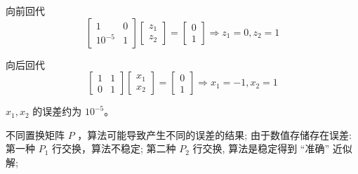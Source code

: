 \begin{example}
    向前回代
    $$
        \left[\begin{array}{cc}
                1       & 0 \\
                10^{-5} & 1
            \end{array}\right]\left[\begin{array}{l}
                z_{1} \\
                z_{2}
            \end{array}\right]=\left[\begin{array}{l}
                0 \\
                1
            \end{array}\right] \Rightarrow z_{1}=0, z_{2}=1
    $$

    向后回代
    $$
        \left[\begin{array}{ll}
                1 & 1 \\
                0 & 1
            \end{array}\right]\left[\begin{array}{l}
                x_{1} \\
                x_{2}
            \end{array}\right]=\left[\begin{array}{l}
                0 \\
                1
            \end{array}\right] \Rightarrow x_{1}=-1, x_{2}=1
    $$

    \begin{remark}
        $ x_{1}, x_{2} $ 的误差约为 $ 10^{-5} $。
    \end{remark}

\end{example}


不同置换矩阵 $ P $ ，算法可能导致产生不同的误差的结果; 由于数值存储存在误差:
第一种 $ P_{1} $ 行交换，算法不稳定;
第二种 $ P_{2} $ 行交换, 算法是稳定得到 “准确” 近似解;

